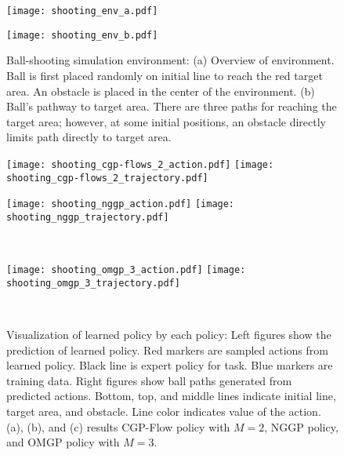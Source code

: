\documentclass[sn-mathphys-num]{sn-jnl}
\begin{document}
\begin{figure}[t]
    \centering
    \begin{minipage}[b]{0.48\hsize}
        \centering
        \texttt{[image: shooting\_env\_a.pdf]}
        \subcaption{}
        \label{fig:shooting:environment:a}
    \end{minipage}
    \begin{minipage}[b]{0.48\hsize}
        \centering
        \texttt{[image: shooting\_env\_b.pdf]}
        \subcaption{}
        \label{fig:shooting:environment:b}
    \end{minipage}
    \caption{Ball-shooting simulation environment: (a) Overview of environment. Ball is first placed randomly on initial line to reach the red target area. An obstacle is placed in the center of the environment. (b) Ball's pathway to target area. There are three paths for reaching the target area; however, at some initial positions, an obstacle directly limits path directly to target area.}
    \label{fig:shooting:environment}
\end{figure}


\begin{figure}[t]
    \centering
    \begin{minipage}[t]{0.49\linewidth}
        \centering
        \texttt{[image: shooting\_cgp-flows\_2\_action.pdf]}
        \texttt{[image: shooting\_cgp-flows\_2\_trajectory.pdf]}
        \label{fig:shooting:plot:a}
    \end{minipage} 
    \begin{minipage}[t]{0.49\linewidth}
        \centering
        \texttt{[image: shooting\_nggp\_action.pdf]}
        \texttt{[image: shooting\_nggp\_trajectory.pdf]}
        \label{fig:shooting:plot:b}
    \end{minipage} \\
    \begin{minipage}[t]{0.49\linewidth}
        \centering
        \texttt{[image: shooting\_omgp\_3\_action.pdf]}
        \texttt{[image: shooting\_omgp\_3\_trajectory.pdf]}
        \label{fig:shooting:plot:c}
    \end{minipage}\\
    \caption{Visualization of learned policy by each policy: Left figures show the prediction of learned policy. Red markers are sampled actions from learned policy. Black line is expert policy for task. Blue markers are training data. Right figures show ball paths generated from predicted actions. Bottom, top, and middle lines indicate initial line, target area, and obstacle. Line color indicates value of the action. (a), (b), and (c) results CGP-Flow policy with $M=2$, NGGP policy, and OMGP policy with $M=3$.}
    \label{fig:shooting:plot}
\end{figure}
\end{document}
